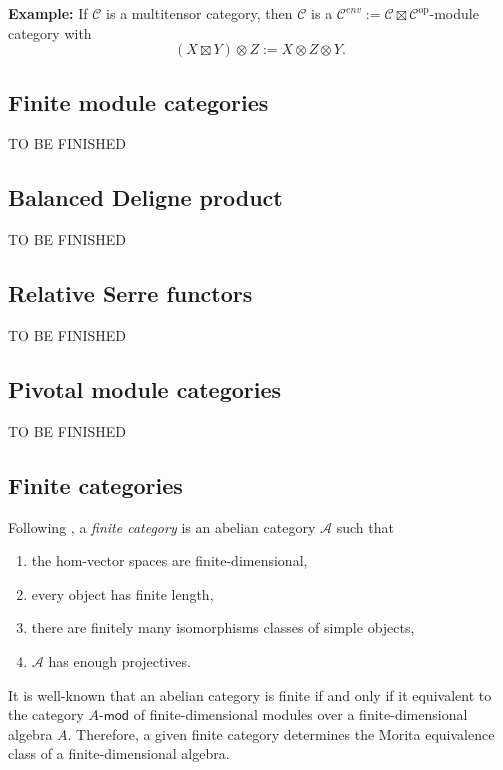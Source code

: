 \documentclass[11pt]{article}
\theoremstyle{definition}
\begin{document}
\textbf{Example:} If \( \mathcal{C} \) is a multitensor category, then \( \mathcal{C} \) is a \( \mathcal{C}^{env}:= \mathcal{C} \boxtimes \mathcal{C}^{\mathrm{op}} \)-module category with
\[ (X \boxtimes Y) \otimes Z := X \otimes Z \otimes Y. \]






\subsection{Finite module categories}

{\color{red} TO BE FINISHED }

\subsection{Balanced Deligne product}

{\color{red} TO BE FINISHED }




\subsection{Relative Serre functors}

{\color{red} TO BE FINISHED }


\subsection{Pivotal module categories}


{\color{red} TO BE FINISHED }


\subsection{Finite categories}

Following \cite{etingofostrik}, a \emph{finite category} is an abelian category $\mathcal{A}$ such that
\begin{enumerate}[label=(\roman*)]\itemsep0em 
  \item the hom-vector spaces are finite-dimensional,
  \item every object has finite length,
  \item there are finitely many isomorphisms classes of simple objects,
  \item $\mathcal{A}$ has enough projectives.
\end{enumerate}
It is well-known that an abelian category is finite if and only if it equivalent to the category $A$-$\mathsf{mod}$ of finite-dimensional modules over a finite-dimensional algebra $A$. Therefore, a given finite category determines the Morita equivalence class of a finite-dimensional algebra.
\end{document}

